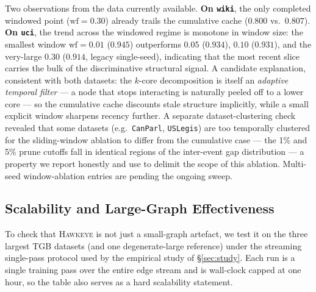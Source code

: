 \documentclass[sigconf,nonacm,review]{acmart}
\newcommand{\method}{\textsc{Hawkeye}\xspace}
\begin{document}
Two observations from the data currently available. \textbf{On \texttt{wiki}},
the only completed windowed point ($\mathrm{wf}=0.30$) already trails the
cumulative cache ($0.800$ vs.\ $0.807$). \textbf{On \texttt{uci}}, the trend
across the windowed regime is monotone in window size: the smallest window
$\mathrm{wf}=0.01$ ($\mathbf{0.945}$) outperforms $0.05$ ($0.934$), $0.10$
($0.931$), and the very-large $0.30$ ($0.914$, legacy single-seed), indicating
that the most recent slice carries the bulk of the discriminative
structural signal. A candidate explanation, consistent with both datasets:
the $k$-core decomposition is itself an \emph{adaptive temporal filter} --- a
node that stops interacting is naturally peeled off to a lower core --- so the
cumulative cache discounts stale structure implicitly, while a small explicit
window sharpens recency further. A separate dataset-clustering check revealed that some datasets
(e.g.\ \texttt{CanParl}, \texttt{USLegis}) are too temporally clustered for
the sliding-window ablation to differ from the cumulative case --- the
1\% and 5\% prune cutoffs fall in identical regions of the inter-event
gap distribution --- a property we report honestly and use to delimit the
scope of this ablation. Multi-seed
window-ablation entries are pending the ongoing sweep.

\subsection{Scalability and Large-Graph Effectiveness}
\label{sec:scalability}

To check that \method is not just a small-graph artefact, we test it on
the three largest TGB datasets (and one degenerate-large reference)
under the streaming single-pass protocol used by the empirical study of
\S\ref{sec:study}. Each run is a single training pass over the entire
edge stream and is wall-clock capped at one hour, so the table also
serves as a hard scalability statement.
\end{document}
